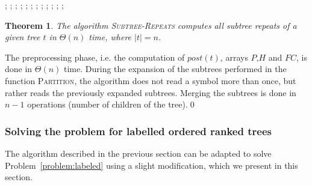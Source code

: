 \documentclass[preprint,12pt]{elsarticle}
\newtheorem{theorem}{Theorem}[section]
\newenvironment{proof}[1][Proof]{\begin{trivlist}
\item[\hskip \labelsep {\bfseries #1}]}{\end{trivlist}}
\begin{document}
\begin{algorithm}
\begin{algorithmic}[1]
 ;
     ;
     ;
   \ELSE
    ;
    ;
   \ENDIF
\ENDFOR
{}
  ;
  ;
   ;
   ;
  \ENDFOR
  ;
 \ELSE
  ;
 \ENDIF
\ENDFOR
{};
\end{algorithmic}
\end{algorithm}

\begin{theorem}
The algorithm \textsc{Subtree-Repeats} computes all subtree repeats of a given tree $t$ in 
$\Theta(n)$ time, where $|t|=n$.
\end{theorem}
\begin{proof}
The preprocessing phase, i.e. the computation of $\textit{post}(t)$, arrays $P$,$H$ and 
$\textit{FC}$, is done in $\Theta(n)$ time. During the expansion of the subtrees performed 
in the function \textsc{Partition}, the algorithm does not read a symbol more than once, but 
rather reads the previously expanded subtrees. Merging the subtrees is done in $n-1$ 
operations (number of children of the tree).\qed
\end{proof}

\subsubsection{Solving the problem for labelled ordered ranked trees}

The algorithm described in the previous section can be adapted to solve Problem~\ref{problem:labeled} 
using a slight modification, which we present in this section.
\end{document}
